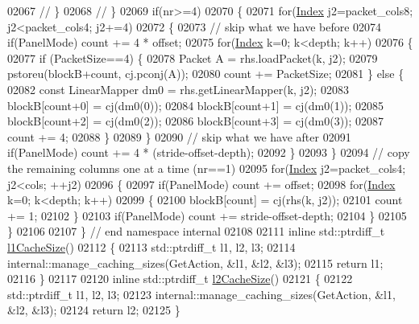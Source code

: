 \begin{DoxyCode}
02067 \textcolor{comment}{//     \}}
02068 \textcolor{comment}{//   \}}
02069   \textcolor{keywordflow}{if}(nr>=4)
02070   \{
02071     \textcolor{keywordflow}{for}(\hyperlink{namespace_eigen_a62e77e0933482dafde8fe197d9a2cfde}{Index} j2=packet\_cols8; j2<packet\_cols4; j2+=4)
02072     \{
02073       \textcolor{comment}{// skip what we have before}
02074       \textcolor{keywordflow}{if}(PanelMode) count += 4 * offset;
02075       \textcolor{keywordflow}{for}(\hyperlink{namespace_eigen_a62e77e0933482dafde8fe197d9a2cfde}{Index} k=0; k<depth; k++)
02076       \{
02077         \textcolor{keywordflow}{if} (PacketSize==4) \{
02078           Packet A = rhs.loadPacket(k, j2);
02079           pstoreu(blockB+count, cj.pconj(A));
02080           count += PacketSize;
02081         \} \textcolor{keywordflow}{else} \{
02082           \textcolor{keyword}{const} LinearMapper dm0 = rhs.getLinearMapper(k, j2);
02083           blockB[count+0] = cj(dm0(0));
02084           blockB[count+1] = cj(dm0(1));
02085           blockB[count+2] = cj(dm0(2));
02086           blockB[count+3] = cj(dm0(3));
02087           count += 4;
02088         \}
02089       \}
02090       \textcolor{comment}{// skip what we have after}
02091       \textcolor{keywordflow}{if}(PanelMode) count += 4 * (stride-offset-depth);
02092     \}
02093   \}
02094   \textcolor{comment}{// copy the remaining columns one at a time (nr==1)}
02095   \textcolor{keywordflow}{for}(\hyperlink{namespace_eigen_a62e77e0933482dafde8fe197d9a2cfde}{Index} j2=packet\_cols4; j2<cols; ++j2)
02096   \{
02097     \textcolor{keywordflow}{if}(PanelMode) count += offset;
02098     \textcolor{keywordflow}{for}(\hyperlink{namespace_eigen_a62e77e0933482dafde8fe197d9a2cfde}{Index} k=0; k<depth; k++)
02099     \{
02100       blockB[count] = cj(rhs(k, j2));
02101       count += 1;
02102     \}
02103     \textcolor{keywordflow}{if}(PanelMode) count += stride-offset-depth;
02104   \}
02105 \}
02106 
02107 \} \textcolor{comment}{// end namespace internal}
02108 
02111 \textcolor{keyword}{inline} std::ptrdiff\_t \hyperlink{namespace_eigen_a2669f89ff38296a38e6d973552eb4e33}{l1CacheSize}()
02112 \{
02113   std::ptrdiff\_t l1, l2, l3;
02114   internal::manage\_caching\_sizes(GetAction, &l1, &l2, &l3);
02115   \textcolor{keywordflow}{return} l1;
02116 \}
02117 
02120 \textcolor{keyword}{inline} std::ptrdiff\_t \hyperlink{namespace_eigen_a2cfc0330ba567d63a496be1cac8427ae}{l2CacheSize}()
02121 \{
02122   std::ptrdiff\_t l1, l2, l3;
02123   internal::manage\_caching\_sizes(GetAction, &l1, &l2, &l3);
02124   \textcolor{keywordflow}{return} l2;
02125 \}

\end{DoxyCode}
